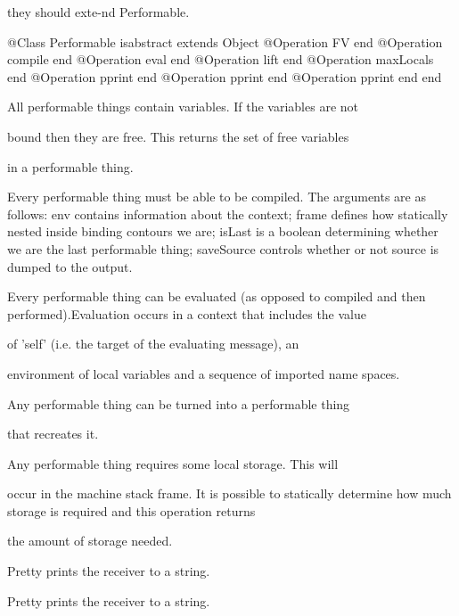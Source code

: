      they should exte-nd Performable.
\begin{Interface}
@Class Performable isabstract extends Object
  @Operation FV end
  @Operation compile end
  @Operation eval end
  @Operation lift end
  @Operation maxLocals end
  @Operation pprint end
  @Operation pprint end
  @Operation pprint end
end
\end{Interface}

      All performable things contain variables. If the variables are not

      bound then they are free. This returns the set of free variables

      in a performable thing.

      Every performable thing must be able to be compiled.
      The arguments are as follows: env contains information about the context;
      frame defines how statically nested inside binding contours we are;
      isLast is a boolean determining whether we are the last performable thing;
      saveSource controls whether or not source is dumped to the output.

      Every performable thing can be evaluated (as opposed to compiled and 
      then performed).Evaluation occurs in a context that includes the value

      of 'self' (i.e. the target of the evaluating message), an

      environment of local variables and a sequence of imported name spaces.

      Any performable thing can be turned into a performable thing

      that recreates it.

      Any performable thing requires some local storage. This will

      occur in the machine stack frame. It is possible to statically 
      determine how much storage is required and this operation returns

      the amount of storage needed.

      Pretty prints the receiver to a string.

      Pretty prints the receiver to a string.

